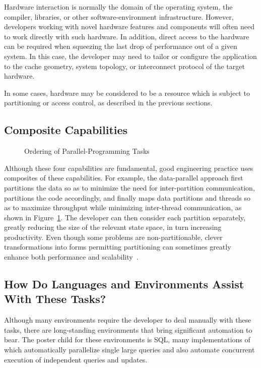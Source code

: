 Hardware interaction is normally the domain of the operating system,
the compiler, libraries, or other software-environment infrastructure.
However, developers working with novel hardware features and components
will often need to work directly with such hardware.
In addition, direct access to the hardware can be required when squeezing
the last drop of performance out of a given system.
In this case, the developer may need to tailor or configure the application
to the cache geometry, system topology, or interconnect protocol of the
target hardware.

In some cases, hardware may be considered to be a resource which
is subject to partitioning or access control, as described in
the previous sections.

\subsection{Composite Capabilities}
\label{sec:Composite Capabilities}

\begin{figure}
\centering
{}
\caption{Ordering of Parallel-Programming Tasks}
\label{fig:intro:Ordering of Parallel-Programming Tasks}
\end{figure}

Although these four capabilities are fundamental,
good engineering practice uses composites of
these capabilities.
For example, the data-parallel approach first
partitions the data so as to minimize the need for
inter-partition communication, partitions the code accordingly,
and finally maps data partitions and threads so as to maximize
throughput while minimizing inter-thread communication,
as shown in
Figure~\ref{fig:intro:Ordering of Parallel-Programming Tasks}.
The developer can then
consider each partition separately, greatly reducing the size
of the relevant state space, in turn increasing productivity.
Even though some problems are non-partitionable,
clever transformations into forms permitting partitioning can
sometimes greatly enhance
both performance and scalability~\cite{PanagiotisMetaxas1999PDCS}.

\subsection{How Do Languages and Environments Assist With These Tasks?}
\label{sec:intro:How Do Languages and Environments Assist With These Tasks?}

Although many environments require the developer to deal manually
with these tasks, there are long-standing environments that bring
significant automation to bear.
The poster child for these environments is SQL, many implementations
of which automatically parallelize single large queries and also
automate concurrent execution of independent queries and updates.

